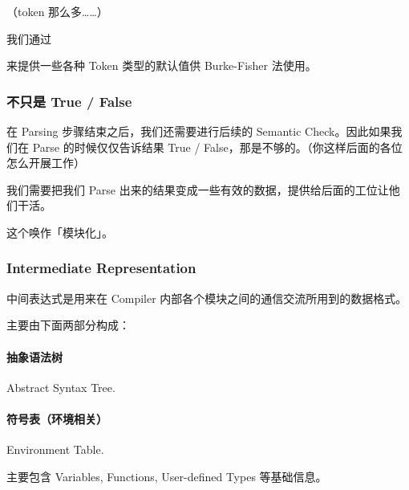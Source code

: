 \documentclass[
]{article}
\newenvironment{Shaded}{}{}
\newcommand{\KeywordTok}[1]{\textcolor[rgb]{0.00,0.44,0.13}{\textbf{#1}}}
\newcommand{\NormalTok}[1]{#1}
\newcommand{\StringTok}[1]{\textcolor[rgb]{0.25,0.44,0.63}{#1}}
\begin{document}
（token 那么多\ldots\ldots）

我们通过

\begin{Shaded}
\begin{Highlighting}[]
\KeywordTok{%value}\NormalTok{ INT\{0\}}

\KeywordTok{%value}\NormalTok{ STRING \{}\StringTok{""}\NormalTok{\}}

\KeywordTok{%value}\NormalTok{ ID \{make_id }\StringTok{"bogus"}\NormalTok{\}}
\end{Highlighting}
\end{Shaded}

来提供一些各种 Token 类型的默认值供 Burke-Fisher 法使用。

\hypertarget{header-n87}{%
\subsubsection{不只是 True / False}\label{header-n87}}

在 Parsing 步骤结束之后，我们还需要进行后续的 Semantic
Check。因此如果我们在 Parse 的时候仅仅告诉结果 True /
False，那是不够的。（你这样后面的各位怎么开展工作）

我们需要把我们 Parse
出来的结果变成一些有效的数据，提供给后面的工位让他们干活。

这个唤作「模块化」。

\hypertarget{header-n91}{%
\subsubsection{Intermediate Representation}\label{header-n91}}

中间表达式是用来在 Compiler 内部各个模块之间的通信交流所用到的数据格式。

主要由下面两部分构成：

\hypertarget{header-n94}{%
\paragraph{抽象语法树}\label{header-n94}}

Abstract Syntax Tree.

\hypertarget{header-n96}{%
\paragraph{符号表（环境相关）}\label{header-n96}}

Environment Table.

主要包含 Variables, Functions, User-defined Types 等基础信息。
\end{document}
